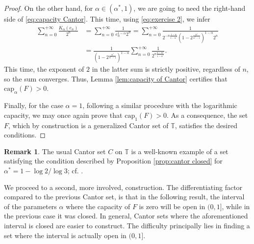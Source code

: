 \documentclass[12pt]{amsart}
\theoremstyle{definition}\newtheorem{remark}[theorem]{Remark}
\theoremstyle{definition}\newtheorem{example}[theorem]{Example}
\theoremstyle{definition}\newtheorem{definition}{Definition}
\numberwithin{equation}{section}
\newcommand\TT{{\mathbb T}}
\begin{document}
\begin{proof}
On the other hand, for $\alpha\in(\alpha^*,1)$, we are going to need the right-hand side of \eqref{eq:capacity Cantor}. This time, using \eqref{eq:exercise 2}, we infer
\begin{align*}
    \sum_{n=0}^{+\infty}\frac{K_{\alpha}(e_n)}{2^n}&=\sum_{n=0}^{+\infty}\frac{1}{e_n^{1-\alpha}2^n}=\sum_{n=0}^{+\infty}\frac{1}{2^{-n\frac{1-\alpha}{1-\alpha^*}}\left(1-2^{\frac{\alpha^*}{\alpha^*-1}}\right)^{1-\alpha}2^n}\\
    &=\frac{1}{\left(1-2^{\frac{\alpha^*}{\alpha^*-1}}\right)^{1-\alpha}}\sum_{n=0}^{+\infty}\frac{1}{2^{n\frac{a-\alpha^*}{1-\alpha^*}}}.
\end{align*}
This time, the exponent of $2$ in the latter sum is strictly positive, regardless of $n$, so the sum converges. Thus, Lemma \ref{lem:capacity of Cantor} certifies that $\mathrm{cap}_\alpha(F)>0$.

Finally, for the case $\alpha=1$, following a similar procedure with the logarithmic capacity, we may once again prove that $\mathrm{cap}_1(F)>0$. As a consequence, the set $F$, which by construction is a generalized Cantor set of $\TT$, satisfies the desired conditions.
\end{proof}

\begin{remark}
    The usual Cantor set $C$ on $\TT$ is a well-known example of a set satisfying the condition described by Proposition \ref{prop:cantor closed} for $\alpha^*=1-\log2/\log3$; cf. \cite[p. 27]{Primer}. 
\end{remark}

We proceed to a second, more involved, construction. The differentiating factor compared to the previous Cantor set, is that in the following result, the interval of the parameters $\alpha$ where the capacity of $F$ is zero will be open in $(0,1]$, while in the previous case it was closed. In general, Cantor sets where the aforementioned interval is closed are easier to construct. The difficulty principally lies in finding a set where the interval is actually open in $(0,1]$.
\end{document}
